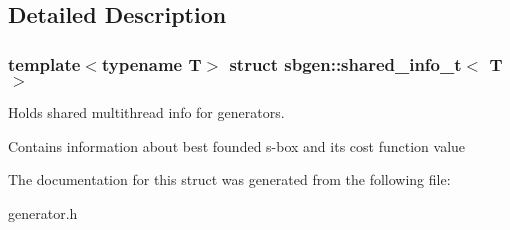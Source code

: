 \subsection{Detailed Description}
\subsubsection*{template$<$typename T$>$\newline
struct sbgen\+::shared\+\_\+info\+\_\+t$<$ T $>$}

Holds shared multithread info for generators. 

Contains information about best founded s-\/box and it\textquotesingle{}s cost function value 

The documentation for this struct was generated from the following file\+:\begin{DoxyCompactItemize}
\item 
generator.\+h\end{DoxyCompactItemize}
